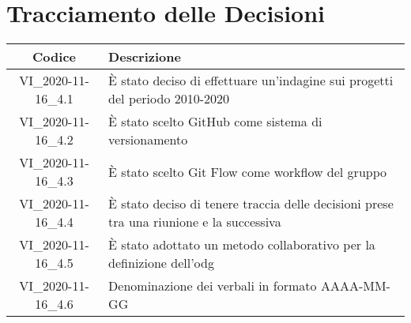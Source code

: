 \section*{Tracciamento delle Decisioni}

\begin{center}
	\begin{longtable}{|c|p{13cm}|}
	\hline
	\rowcolor{lighter-grayer}
	\textbf{Codice} & \textbf{Descrizione} \\
	\hline
	\endfirsthead
	

	VI\_2020-11-16\_4.1 & È stato deciso di effettuare un'indagine sui progetti del periodo 2010-2020 \\
	\hline
	VI\_2020-11-16\_4.2 & È stato scelto GitHub come sistema di versionamento \\
	\hline
	VI\_2020-11-16\_4.3 & È stato scelto Git Flow come workflow del gruppo \\
	\hline
	VI\_2020-11-16\_4.4 & È stato deciso di tenere traccia delle decisioni prese tra una riunione e la successiva \\
	\hline
	VI\_2020-11-16\_4.5 & È stato adottato un metodo collaborativo per la definizione dell'odg \\
	\hline
	VI\_2020-11-16\_4.6 & Denominazione dei verbali in formato AAAA-MM-GG \\
	\hline

	\end{longtable}
\end{center}